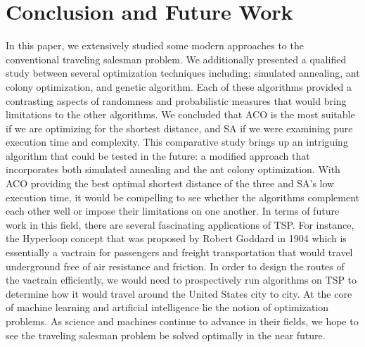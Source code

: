 \documentclass{article}
\begin{document}
\section{Conclusion and Future Work}
In this paper, we extensively studied some modern approaches to the conventional traveling salesman problem. We additionally presented a qualified study between several optimization techniques including: simulated annealing, ant colony optimization, and genetic algorithm. Each of these algorithms provided a contrasting aspects of randomness and probabilistic measures that would bring limitations to the other algorithms. We concluded that ACO is the most suitable if we are optimizing for the shortest distance, and SA if we were examining pure execution time and complexity. This comparative study brings up an intriguing algorithm that could be tested in the future: a modified approach that incorporates both simulated annealing and the ant colony optimization. With ACO providing the best optimal shortest distance of the three and SA's low execution time, it would be compelling to see whether the algorithms complement each other well or impose their limitations on one another. In terms of future work in this field, there are several fascinating applications of TSP. For instance, the Hyperloop concept that was proposed by Robert Goddard in 1904 which is essentially a vactrain for passengers and freight transportation that would travel underground free of air resistance and friction. In order to design the routes of the vactrain efficiently, we would need to prospectively run algorithms on TSP to determine how it would travel around the United States city to city. At the core of machine learning and artificial intelligence lie the notion of optimization problems. As science and machines continue to advance in their fields, we hope to see the traveling salesman problem be solved optimally in the near future.  


 

\newpage

\raggedright

\end{document}
